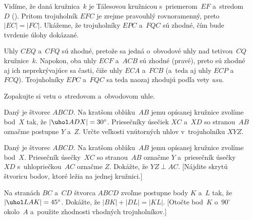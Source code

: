 {%
Vidíme, že daná kružnica~$k$ je Tálesovou kružnicou s~priemerom~$EF$
a~stredom~$D$ (\obr). Pritom trojuholník $EFC$ je zrejme pravouhlý rovnoramenný,
preto $|EC|=|FC|$. Ukážeme, že trojuholníky $EPC$ a~$FQC$ sú zhodné, čím bude
tvrdenie úlohy dokázané.
%

Uhly $CEQ$ a~$CFQ$ sú zhodné, pretože sa jedná o~obvodové uhly nad tetivou~$CQ$
kružnice~$k$. Napokon, oba uhly $ECF$ a~$ACB$ sú zhodné (pravé), preto sú
zhodné aj ich neprekrývajúce sa časti, čiže uhly $ECA$ a~$FCB$
(a~teda aj uhly $ECP$ a~$FCQ$). Trojuholníky $EPC$ a~$FQC$ sa teda naozaj
zhodujú podľa vety {\it usu}.

Zopakujte si vetu o~stredovom a~obvodovom uhle.

Daný je štvorec $ABCD$. Na kratšom oblúku~$AB$ jemu opísanej kružnice
zvolíme bod~$X$ tak, že $|\uhol ADX| = 30^\circ$. Priesečníky
úsečiek $XC$ a~$XD$ so stranou~$AB$ označme postupne $Y$ a~$Z$. Určte
veľkosti vnútorných uhlov v~trojuholníku $XYZ$.

\D
Daný je štvorec $ABCD$. Na kratšom oblúku~$AB$ jemu opísanej kružnice
zvolíme bod~$X$. Priesečník úsečky~$XC$ so stranou~$AB$ označme
$Y$ a~priesečník úsečky~$XD$ s~uhlopriečkou~$AC$ označme $Z$. Dokážte, že
$YZ \perp AC$. [Nájdite skrytú štvoricu bodov, ktoré ležia na jednej
kružnici.]

Na stranách $BC$ a~$CD$ štvorca $ABCD$ zvoľme postupne body $K$
a~$L$ tak, že $|\uhol LAK| = 45^\circ$. Dokážte, že $|BK| + |DL| = |KL|$.
[Otočte bod~$K$ o~$90^\circ$ okolo~$A$ a~použite zhodnosti vhodných
trojuholníkov.]
}

